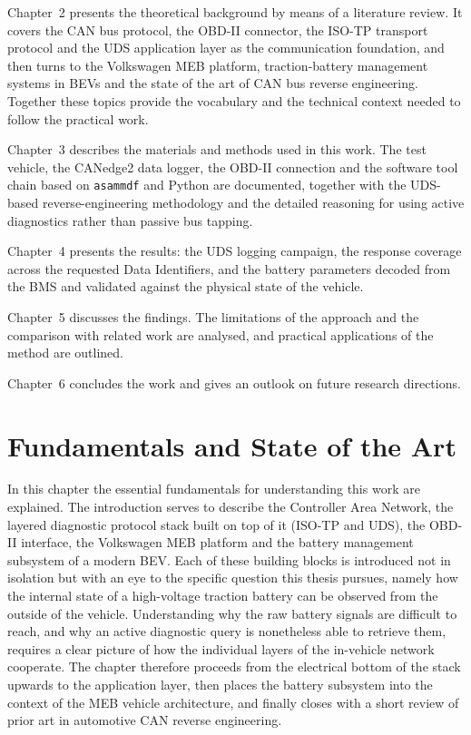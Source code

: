 \documentclass[11pt,a4paper,oneside,parskip=half]{scrreprt}
\begin{document}
Chapter~2 presents the theoretical background by means of a literature review. It covers the CAN bus protocol, the OBD-II connector, the ISO-TP transport protocol and the UDS application layer as the communication foundation, and then turns to the Volkswagen MEB platform, traction-battery management systems in BEVs and the state of the art of CAN bus reverse engineering. Together these topics provide the vocabulary and the technical context needed to follow the practical work.

Chapter~3 describes the materials and methods used in this work. The test vehicle, the CANedge2 data logger, the OBD-II connection and the software tool chain based on \texttt{asammdf} and Python are documented, together with the UDS-based reverse-engineering methodology and the detailed reasoning for using active diagnostics rather than passive bus tapping.

Chapter~4 presents the results: the UDS logging campaign, the response coverage across the requested Data Identifiers, and the battery parameters decoded from the BMS and validated against the physical state of the vehicle.

Chapter~5 discusses the findings. The limitations of the approach and the comparison with related work are analysed, and practical applications of the method are outlined.

Chapter~6 concludes the work and gives an outlook on future research directions.


\chapter{Fundamentals and State of the Art}
In this chapter the essential fundamentals for understanding this work are explained. The introduction serves to describe the Controller Area Network, the layered diagnostic protocol stack built on top of it (ISO-TP and UDS), the OBD-II interface, the Volkswagen MEB platform and the battery management subsystem of a modern BEV. Each of these building blocks is introduced not in isolation but with an eye to the specific question this thesis pursues, namely how the internal state of a high-voltage traction battery can be observed from the outside of the vehicle. Understanding why the raw battery signals are difficult to reach, and why an active diagnostic query is nonetheless able to retrieve them, requires a clear picture of how the individual layers of the in-vehicle network cooperate. The chapter therefore proceeds from the electrical bottom of the stack upwards to the application layer, then places the battery subsystem into the context of the MEB vehicle architecture, and finally closes with a short review of prior art in automotive CAN reverse engineering.
\end{document}
